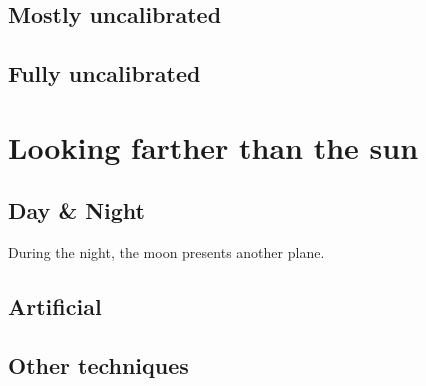 \documentclass{report}
\begin{document}
\subsection{Mostly uncalibrated}


\subsection{Fully uncalibrated}

\section{Looking farther than the sun}


\subsection{Day \& Night}
During the night, the moon presents another plane.



\subsection{Artificial}




\subsection{Other techniques}




\end{document}
